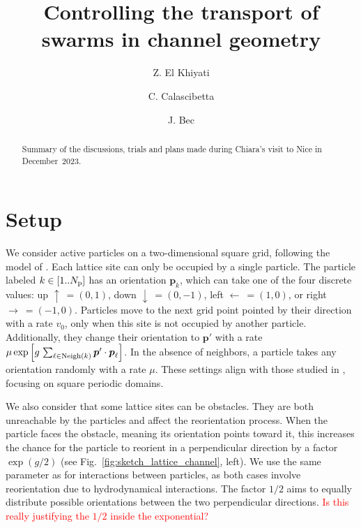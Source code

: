 \documentclass[aps,prl,twocolumn,amsmath,amssymb,superscriptaddress]{revtex4-1}
\newcommand{\obs}[1]{\textcolor{red}{#1}}
\begin{document}
\title{Controlling the transport of swarms in channel geometry}
\author{Z. El Khiyati}
\author{C. Calascibetta}
\author{J. Bec}


\begin{abstract}
Summary of the discussions, trials and plans made during Chiara's visit to Nice in December~2023.
\end{abstract}

\maketitle

\section{Setup}

We consider active particles on a two-dimensional square grid, following the model of \cite{peruani2011traffic}. Each lattice site can only be occupied by a single particle. The particle labeled $k\in[1..N_{\rm p}]$ has an orientation $\boldsymbol{p}_{k}$, which can take one of the four discrete values: up $\uparrow\ = (0,1)$, down $\downarrow\ = (0,-1)$, left $\leftarrow\ = (1,0)$, or right $\rightarrow\ = (-1,0)$. Particles move to the next grid point pointed by their direction with a rate $v_0$, only when this site is not occupied by another particle. Additionally, they change their orientation to $\boldsymbol{p}'$ with a rate $\mu\exp \left[g\,\sum_{\ell\in{\rm Neigh}(k)} \boldsymbol{p}' \cdot \boldsymbol{p}_{\ell}\right]$. In the absence of neighbors, a particle takes any orientation randomly with a rate $\mu$. These settings align with those studied in \cite{peruani2011traffic}, focusing on square periodic domains.

We also consider that some lattice sites can be obstacles. They are both unreachable by the particles and affect the reorientation process. When the particle faces the obstacle, meaning its orientation points toward it, this increases the chance for the particle to reorient in a perpendicular direction by a factor $\exp(g/2)$ (see Fig.~\ref{fig:sketch_lattice_channel}, left). We use the same parameter as for interactions between particles, as both cases involve reorientation due to hydrodynamical interactions. The factor $1/2$ aims to equally distribute possible orientations between the two perpendicular directions. \obs{Is this really justifying the $1/2$ inside the exponential?}
\end{document}
